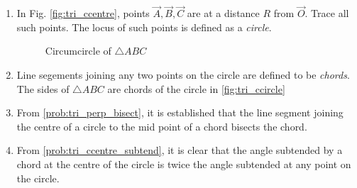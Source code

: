 \renewcommand{\theequation}{\theenumi}
\begin{enumerate}[label=\thesection.\arabic*.,ref=\thesection.\theenumi]

\item In Fig. \ref{fig:tri_ccentre}, points $\vec{A}, \vec{B}, \vec{C}$  are at a distance $R$ from $\vec{O}$.  Trace all such points. The locus of such points is defined as a {\em circle}.
%
	\iffalse
\\
\solution This is done by the following python code
%
\begin{lstlisting}
codes/circle/tri_ccircle.py
\end{lstlisting}
%
and the equivalent latex-tikz code to draw Fig. \ref{fig:tri_ccircle} is
%
\begin{lstlisting}
figs/triangle/tri_ccircle.tex
\end{lstlisting}
\fi
\begin{figure}[!ht]
	\begin{center}
		
		\resizebox{\columnwidth}{!}{}
	\end{center}
	\caption{Circumcircle of $\triangle ABC$}
	\label{fig:tri_ccircle}	
\end{figure}
%
\item Line segements joining any two points on the circle are defined to be {\em chords}. The sides of $\triangle ABC$ are chords of the circle in 	\eqref{fig:tri_ccircle}	

\item From  \eqref{prob:tri_perp_bisect}, it is established that the line segment joining the centre of a circle to the mid point of a chord bisects the chord.
\item From \eqref{prob:tri_ccentre_subtend}, it is clear that the angle subtended by a chord at the centre of the circle is twice the angle subtended at any point on the circle.
\label{them:tri_ccentre_subtend}
%

\end{enumerate}

